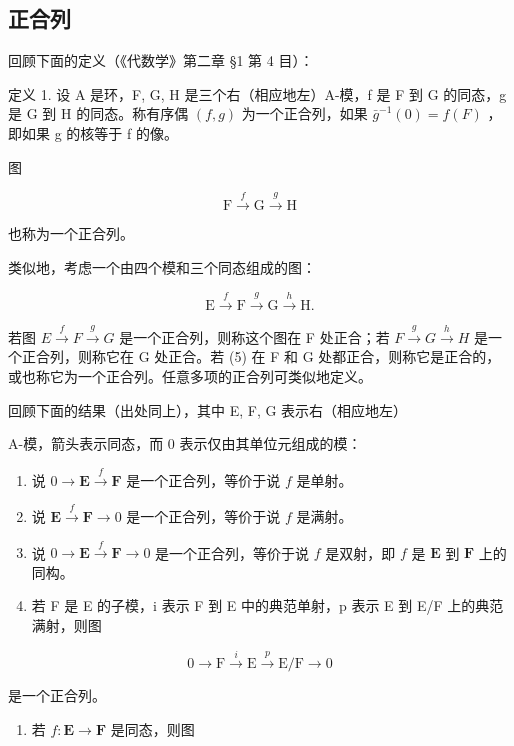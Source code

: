 \subsection{正合列}

回顾下面的定义（《代数学》第二章 §1 第 4 目）：

定义 1. 设 A 是环，F, G, H 是三个右（相应地左）A-模，f 是 F 到 G 的同态，g 是 G 到 H 的同态。称有序偶 \((f, g)\) 为一个正合列，如果 \(\bar{g}^{-1}(0) = f(F)\) ，即如果 g 的核等于 f 的像。

图

\[
\mathrm{F} \xrightarrow {f} \mathrm{G} \xrightarrow {g} \mathrm{H}\tag{4}
\]

也称为一个正合列。

类似地，考虑一个由四个模和三个同态组成的图：

\[
\mathrm{E} \xrightarrow {f} \mathrm{F} \xrightarrow {g} \mathrm{G} \xrightarrow {h} \mathrm{H}.\tag{5}
\]

若图 \(E \xrightarrow{f} F \xrightarrow{g} G\) 是一个正合列，则称这个图在 F 处正合；若 \(F \xrightarrow{g} G \xrightarrow{h} H\) 是一个正合列，则称它在 G 处正合。若 (5) 在 F 和 G 处都正合，则称它是正合的，或也称它为一个正合列。任意多项的正合列可类似地定义。

回顾下面的结果（出处同上），其中 E, F, G 表示右（相应地左）

A-模，箭头表示同态，而 0 表示仅由其单位元组成的模：

\begin{enumerate}
\def\labelenumi{(\alph{enumi})}
\item
  说 \(0 \to \mathbf{E} \xrightarrow{f} \mathbf{F}\) 是一个正合列，等价于说 \(f\) 是单射。
\item
  说 \(\mathbf{E} \xrightarrow{f} \mathbf{F} \to 0\) 是一个正合列，等价于说 \(f\) 是满射。
\item
  说 \(0 \to \mathbf{E} \xrightarrow{f} \mathbf{F} \to 0\) 是一个正合列，等价于说 \(f\) 是双射，即 \(f\) 是 \(\mathbf{E}\) 到 \(\mathbf{F}\) 上的同构。
\item
  若 F 是 E 的子模，i 表示 F 到 E 中的典范单射，p 表示 E 到 E/F 上的典范满射，则图
\end{enumerate}

\[
0 \longrightarrow \mathrm{F} \stackrel {i} {\longrightarrow} \mathrm{E} \stackrel {p} {\longrightarrow} \mathrm{E} / \mathrm{F} \longrightarrow 0\tag{6}
\]

是一个正合列。

\begin{enumerate}
\def\labelenumi{(\alph{enumi})}
\setcounter{enumi}{4}
\tightlist
\item
  若 \(f: \mathbf{E} \to \mathbf{F}\) 是同态，则图
\end{enumerate}

